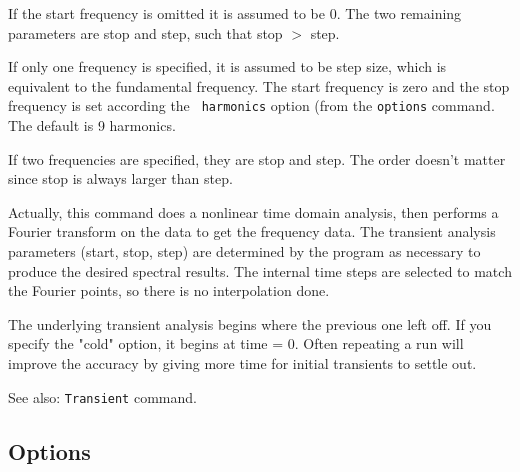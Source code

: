 If the start frequency is omitted it is assumed to be 0.  The two
remaining parameters are stop and step, such that stop $>$ step.

If only one frequency is specified, it is assumed to be step size,
which is equivalent to the fundamental frequency.  The start
frequency is zero and the stop frequency is set according the {\tt
harmonics} option (from the {\tt options} command.  The default is
9 harmonics.

If two frequencies are specified, they are stop and step.  The
order doesn't matter since stop is always larger than step.

Actually, this command does a nonlinear time domain analysis, then
performs a Fourier transform on the data to get the frequency data.
The transient analysis parameters (start, stop, step) are determined
by the program as necessary to produce the desired spectral results.
The internal time steps are selected to match the Fourier points,
so there is no interpolation done.

The underlying transient analysis begins where the previous one
left off.  If you specify the "cold" option, it begins at time =
0.  Often repeating a run will improve the accuracy by giving more
time for initial transients to settle out.

See also: {\tt Transient} command.
\subsection{Options}


